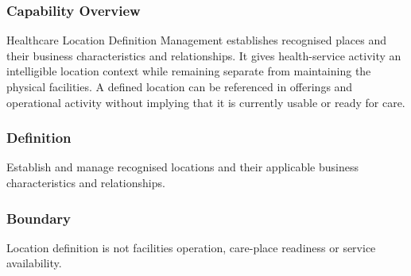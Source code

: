 \subsubsection*{Capability Overview}

Healthcare Location Definition Management establishes recognised places and their business characteristics and relationships. It gives health-service activity an intelligible location context while remaining separate from maintaining the physical facilities. A defined location can be referenced in offerings and operational activity without implying that it is currently usable or ready for care.

\subsubsection*{Definition}

Establish and manage recognised locations and their applicable business characteristics and relationships.

\subsubsection*{Boundary}

Location definition is not facilities operation, care-place readiness or service availability.

